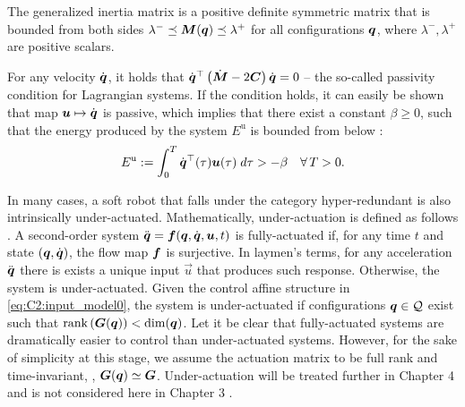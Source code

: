 \begin{asm}
The generalized inertia matrix is a positive definite symmetric matrix that is bounded from both sides $\lambda^{-} \preceq \boldsymbol{M}({\boldsymbol{q}}) \preceq \lambda^{+}$ for all configurations ${\boldsymbol{q}}$, where $\lambda^{-},\lambda^{+}$ are positive scalars.
\end{asm}

\begin{asm}[Passivity]
For any velocity $\dot{{\boldsymbol{q}}}$, it holds that $\dot{{\boldsymbol{q}}}^\top\left(\dot{\boldsymbol{M}} - 2\boldsymbol{C}  \right)\dot{{\boldsymbol{q}}} = 0$ -- the so-called passivity condition for Lagrangian systems. If the condition holds, it can easily be shown that map ${\boldsymbol{u}} \mapsto \dot{{\boldsymbol{q}}}$ is passive, which implies that there exist a constant $\beta \ge 0$, such that the energy produced by the system $E^{\textrm{u}}$ is bounded from below \cite{Ortega1998}:
%
\begin{equation}
E^{\textrm{u}} := \int_0^T {\dot{\boldsymbol{q}}}^\top(\tau) {\boldsymbol{u}}(\tau) \;d\tau > -\beta \quad \forall\,T > 0.
\label{as:C2:passivity}
\end{equation}
%
\end{asm}

\begin{asm}
In many cases, a soft robot that falls under the category hyper-redundant is also intrinsically under-actuated. Mathematically, under-actuation is defined as follows \cite{Russ2022}. A second-order system $\ddot{{\boldsymbol{q}}} = {\boldsymbol{f}}({\boldsymbol{q}},{\dot{\boldsymbol{q}}},{\boldsymbol{u}},t)$ is fully-actuated if, for any time $t$ and state $({\boldsymbol{q}},{\dot{\boldsymbol{q}}})$, the flow map ${\boldsymbol{f}}$ is surjective. In laymen's terms, for any acceleration $\ddot{{\boldsymbol{q}}}$ there is exists a unique input $\vec{u}$ that produces such response. Otherwise, the system is under-actuated. Given the control affine structure in \eqref{eq:C2:input_model0}, the system is under-actuated if configurations ${\boldsymbol{q}} \in \mathcal{Q}$ exist such that $\textnormal{rank} \left( \boldsymbol{G}({\boldsymbol{q}}) \right) < \text{dim}({\boldsymbol{q}})$. Let it be clear that fully-actuated systems are dramatically easier to control than under-actuated systems. However, for the sake of simplicity at this stage, we assume the actuation matrix to be full rank and time-invariant, \ie, $\boldsymbol{G}({\boldsymbol{q}}) \simeq \boldsymbol{G}$. Under-actuation will be treated further in Chapter 4 and  is not considered here in Chapter 3 .
\end{asm}

